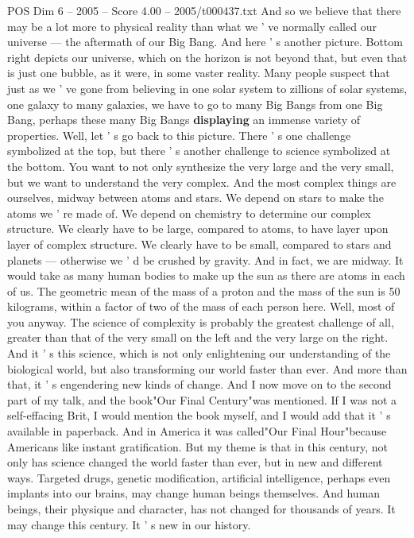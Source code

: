 \begin{textsample}{POS Dim 6 – 2005 – Score 4.00 – 2005/t000437.txt}
And so we believe that there may be a lot more to physical reality than what we ' ve normally called our universe — the aftermath of our Big Bang.
And here ' s another picture.
Bottom right depicts our universe, which on the horizon is not beyond that, but even that is just one bubble, as it were, in some vaster reality.
Many people suspect that just as we ' ve gone from believing in one solar system to zillions of solar systems, one galaxy to many galaxies, we have to go to many Big Bangs from one Big Bang, perhaps these many Big Bangs \textbf{displaying} an immense variety of properties.
Well, let ' s go back to this picture.
There ' s one challenge symbolized at the top, but there ' s another challenge to science symbolized at the bottom.
You want to not only synthesize the very large and the very small, but we want to understand the very complex.
And the most complex things are ourselves, midway between atoms and stars.
We depend on stars to make the atoms we ' re made of.
We depend on chemistry to determine our complex structure.
We clearly have to be large, compared to atoms, to have layer upon layer of complex structure.
We clearly have to be small, compared to stars and planets — otherwise we ' d be crushed by gravity.
And in fact, we are midway.
It would take as many human bodies to make up the sun as there are atoms in each of us.
The geometric mean of the mass of a proton and the mass of the sun is 50 kilograms, within a factor of two of the mass of each person here.
Well, most of you anyway.
The science of complexity is probably the greatest challenge of all, greater than that of the very small on the left and the very large on the right.
And it ' s this science, which is not only enlightening our understanding of the biological world, but also transforming our world faster than ever.
And more than that, it ' s engendering new kinds of change.
And I now move on to the second part of my talk, and the book"Our Final Century"was mentioned.
If I was not a self-effacing Brit, I would mention the book myself, and I would add that it ' s available in paperback.
And in America it was called"Our Final Hour"because Americans like instant gratification.
But my theme is that in this century, not only has science changed the world faster than ever, but in new and different ways.
Targeted drugs, genetic modification, artificial intelligence, perhaps even implants into our brains, may change human beings themselves.
And human beings, their physique and character, has not changed for thousands of years.
It may change this century.
It ' s new in our history.

\end{textsample}
